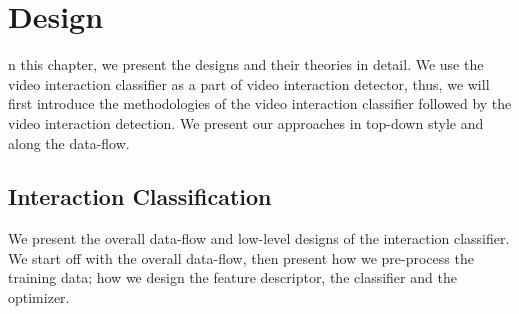 %
%
\let\textcircled=\pgftextcircled
\chapter{Design}
\label{chap4}

n this chapter, we present the designs and their theories in detail. We use the video interaction classifier as a part of video interaction detector, thus, we will first introduce the methodologies of the video interaction classifier followed by the video interaction detection. We present our approaches in top-down style and along the data-flow.

\section{Interaction Classification}
We present the overall data-flow and low-level designs of the interaction classifier. We start off with the overall data-flow, then present how we pre-process the training data; how we design the feature descriptor, the classifier and the optimizer. 

